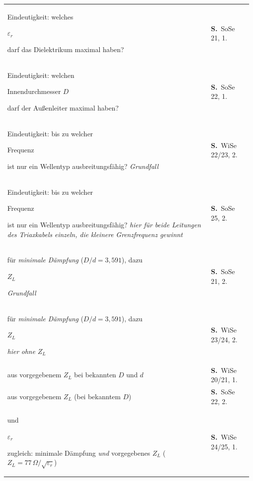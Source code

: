 \documentclass[a4paper,10pt]{article}
\newcommand{\gs}[1]{{\setlength{\fboxsep}{0.5mm}%
  \colorbox{MarkerG!45}{\strut #1}}}
\begin{document}
\begin{tabularx}{\textwidth}{@{}>{\RaggedRight}X>{\RaggedRight\scriptsize}p{27mm}@{}}
\hline\rule{0pt}{3.5mm}
Eindeutigkeit: welches \gs{$\varepsilon_r$} darf das Dielektrikum maximal haben? & \textbf{S.\,\pageref{tf:SoSe21:1:1}} \textcolor{Grau}{SoSe 21, 1.} \\
Eindeutigkeit: welchen \gs{Innendurchmesser $D$} darf der Außenleiter maximal haben? & \textbf{S.\,\pageref{tf:SoSe22:1:1}} \textcolor{Grau}{SoSe 22, 1.} \\
Eindeutigkeit: bis zu welcher \gs{Frequenz} ist nur ein Wellentyp ausbreitungsfähig? \newline \hspace*{3mm}\textcolor{Grau}{\itshape \textendash{} Grundfall} & \textbf{S.\,\pageref{tf:WiSe22x23:1:2}} \textcolor{Grau}{WiSe 22/23, 2.} \\
Eindeutigkeit: bis zu welcher \gs{Frequenz} ist nur ein Wellentyp ausbreitungsfähig? \newline \hspace*{3mm}\textcolor{Grau}{\itshape \textendash{} hier für \emph{beide} Leitungen des Triaxkabels einzeln, die kleinere Grenzfrequenz gewinnt} & \textbf{S.\,\pageref{tf:SoSe25:1:2}} \textcolor{Grau}{SoSe 25, 2.} \\
\gs{Innenleiter-Durchmesser $d$} für \emph{minimale Dämpfung} ($D/d=3{,}591$), dazu \gs{$Z_L$} \newline \hspace*{3mm}\textcolor{Grau}{\itshape \textendash{} Grundfall} & \textbf{S.\,\pageref{tf:SoSe21:1:2}} \textcolor{Grau}{SoSe 21, 2.} \\
\gs{Innenleiter-Durchmesser $d$} für \emph{minimale Dämpfung} ($D/d=3{,}591$), dazu \gs{$Z_L$} \newline \hspace*{3mm}\textcolor{Grau}{\itshape \textendash{} hier ohne $Z_L$} & \textbf{S.\,\pageref{tf:WiSe23x24:1:2}} \textcolor{Grau}{WiSe 23/24, 2.} \\
\gs{$\varepsilon_r$} aus vorgegebenem $Z_L$ bei bekannten $D$ und $d$ & \textbf{S.\,\pageref{tf:WiSe20x21:1:1}} \textcolor{Grau}{WiSe 20/21, 1.} \\
\gs{$d$} aus vorgegebenem $Z_L$ (bei bekanntem $D$) & \textbf{S.\,\pageref{tf:SoSe22:1:2}} \textcolor{Grau}{SoSe 22, 2.} \\
\gs{$d$} und \gs{$\varepsilon_r$} zugleich: minimale Dämpfung \emph{und} vorgegebenes $Z_L$ ($Z_L = 77\,\Omega/\sqrt{\varepsilon_r}$) & \textbf{S.\,\pageref{tf:WiSe24y25:1:1}} \textcolor{Grau}{WiSe 24/25, 1.} \\

\end{tabularx}
\end{document}
